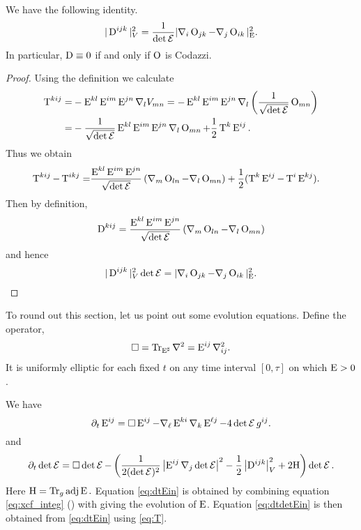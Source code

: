 \documentclass[a4paper,12pt]{amsart}
\begin{document}
\begin{lemma}
\label{lem:cubicform_codazzi}

We have the following identity.
\[
|\operatorname{D}^{ijk}|_V^2=\frac{1}{\det\operatorname{\mathcal{E}}}|\nabla_i\operatorname{O}_{jk}-\nabla_j\operatorname{O}_{ik}|_{\operatorname{E}}^2.
\]
In particular, \(\operatorname{D}\equiv 0\) if and only if \(\operatorname{O}\) is Codazzi.
\end{lemma}

\begin{proof}
Using the definition we calculate
\begin{align*}
\operatorname{T}^{kij}=&-\operatorname{E}^{kl}\operatorname{E}^{im}\operatorname{E}^{jn}\nabla_l V_{mn} = -\operatorname{E}^{kl}\operatorname{E}^{im}\operatorname{E}^{jn}\nabla_l \left(\frac{1}{\sqrt{\det\operatorname{\mathcal{E}}}} \operatorname{O}_{mn}\right)\\
=&-\frac{1}{\sqrt{\det\operatorname{\mathcal{E}}}}\operatorname{E}^{kl}\operatorname{E}^{im}\operatorname{E}^{jn}\nabla_l \operatorname{O}_{mn}+\frac{1}{2}\operatorname{T}^k\operatorname{E}^{ij}.
\end{align*}
Thus we obtain
\begin{align*}
\operatorname{T}^{kij}-\operatorname{T}^{ikj}=&\frac{\operatorname{E}^{kl}\operatorname{E}^{im}\operatorname{E}^{jn}}{\sqrt{\det\operatorname{\mathcal{E}}}}\left(\nabla_m \operatorname{O}_{ln}-\nabla_l \operatorname{O}_{mn}\right)+\frac{1}{2}(\operatorname{T}^k\operatorname{E}^{ij}-\operatorname{T}^i\operatorname{E}^{kj}).
\end{align*}
Then by definition,
\[
\operatorname{D}^{kij} = \frac{\operatorname{E}^{kl}\operatorname{E}^{im}\operatorname{E}^{jn}}{\sqrt{\det\operatorname{\mathcal{E}}}}\left(\nabla_m \operatorname{O}_{ln}-\nabla_l \operatorname{O}_{mn}\right)
\]
and hence
\[
|\operatorname{D}^{ijk}|_V^2\det\operatorname{\mathcal{E}} = |\nabla_i\operatorname{O}_{jk}-\nabla_j\operatorname{O}_{ik}|_{\operatorname{E}}^2.
\]
\end{proof}

To round out this section, let us point out some evolution equations. Define the operator,
\begin{equation}
\label{eq:box}
\Box = \operatorname{Tr}_{\operatorname{E}^{\sharp}} \nabla^2 = \operatorname{E}^{ij} \nabla^2_{ij}.
\end{equation}
It is uniformly elliptic for each fixed \(t\) on any time interval \([0, \tau]\) on which \(\operatorname{E} > 0\).

We have
\begin{equation}
\label{eq:dtEin}
\partial_t \operatorname{E}^{ij} = \Box \operatorname{E}^{ij} - \nabla_{\ell} \operatorname{E}^{ki} \nabla_k \operatorname{E}^{\ell j} - 4 \det \operatorname{\mathcal{E}} g^{ij}.
\end{equation}
and
\begin{equation}
\label{eq:dtdetEin}
\partial_t \det \operatorname{\mathcal{E}} = \Box \det \operatorname{\mathcal{E}} -\left(\frac{1}{2(\det\operatorname{\mathcal{E}})^2} \left\lvert{\operatorname{E}^{ij} \nabla_j \det \operatorname{\mathcal{E}}}\right\rvert^2 - \frac{1}{2}\left\lvert{\mathrm{D}^{ijk}}\right\rvert_V^2 + 2\mathrm{H}\right)\det \operatorname{\mathcal{E}}.
\end{equation}
Here $\mathrm{H}=\operatorname{Tr}_g\operatorname{adj}\operatorname{E}.$ 
Equation \eqref{eq:dtEin} is obtained by combining equation \eqref{eq:xcf_integ} (\cite[Lemma 1(a)]{MR2055396}) with \cite[Lemma 5]{MR2055396} giving the evolution of \(\operatorname{E}\). Equation \eqref{eq:dtdetEin} is then obtained from \eqref{eq:dtEin} using \eqref{eq:T}.
\end{document}

